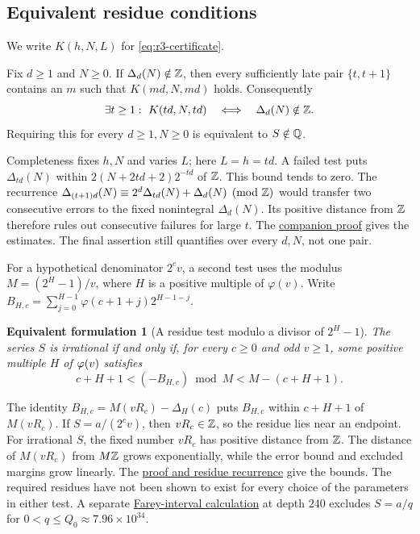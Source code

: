 \documentclass[11pt]{article}
\newtheorem{equivform}[theorem]{Equivalent formulation}
\newcommand{\longrecord}[2]{\href{erdos249-totient-reasoning-surface.pdf\##1}{#2}}
\begin{document}
\subsection{Equivalent residue conditions}\label{sec:frontier}
We write $K(h,N,L)$ for \eqref{eq:r3-certificate}.
\begin{theorem}\label{res:fulldepth}
Fix $d\ge1$ and $N\ge0$. If $\Delta_d(N)\notin\mathbb{Z}$, then every sufficiently
late pair $\{t,t+1\}$ contains an $m$ such that $K(md,N,md)$ holds.
Consequently
\[
 \exists t\ge1:\ K(td,N,td)
 \quad\Longleftrightarrow\quad\Delta_d(N)\notin\Z.
\]
Requiring this for every $d\ge1,N\ge0$ is equivalent to $S\notin\mathbb{Q}$.
\end{theorem}
Completeness fixes $h,N$ and varies $L$; here $L=h=td$.
A failed test puts $\Delta_{td}(N)$ within
$2(N+2td+2)2^{-td}$ of $\mathbb{Z}$. This bound tends to zero. The recurrence
$\Delta_{(t+1)d}(N)\equiv2^d\Delta_{td}(N)+\Delta_d(N)\pmod{\mathbb{Z}}$
would transfer two consecutive errors to the fixed nonintegral
$\Delta_d(N)$. Its positive distance from $\mathbb{Z}$ therefore rules out
consecutive failures for large $t$.
The \longrecord{long249-r3-ray}{companion proof} gives the estimates.
The final assertion still quantifies over every $d,N$, not one pair.

For a hypothetical denominator $2^cv$, a second test uses the
modulus $M=(2^H-1)/v$, where $H$ is a positive multiple of $\varphi(v)$.
Write $B_{H,c}=\sum_{j=0}^{H-1}\varphi(c+1+j)2^{H-1-j}$.
\begin{equivform}[A residue test modulo a divisor of $2^H-1$]\label{res:canonicalmersenne}
The series $S$ is irrational if and only if, for every $c\ge0$ and odd
$v\ge1$, some positive multiple $H$ of $\varphi(v)$ satisfies
\begin{equation}\label{eq:canonical-gap}
 c+H+1<(-B_{H,c})\bmod M<M-(c+H+1).
\end{equation}
\end{equivform}
The identity $B_{H,c}=M(vR_c)-\Delta_H(c)$ puts $B_{H,c}$ within
$c+H+1$ of $M(vR_c)$. If $S=a/(2^cv)$, then $vR_c\in\mathbb{Z}$,
so the residue lies near an endpoint. For irrational $S$, the fixed
number $vR_c$ has positive distance from $\mathbb{Z}$. The distance of $M(vR_c)$ from
$M\mathbb{Z}$ grows exponentially, while the error bound and excluded
margins grow linearly.
The \longrecord{long249-r3-mersenne}{proof and residue recurrence}
give the bounds.
The required residues have not been shown to exist for every choice
of the parameters in either test. A separate
\longrecord{long249-r3-farey}{Farey-interval calculation} at depth $240$
excludes $S=a/q$ for $0<q\le Q_0\approx7.96\times10^{34}$.
\end{document}
